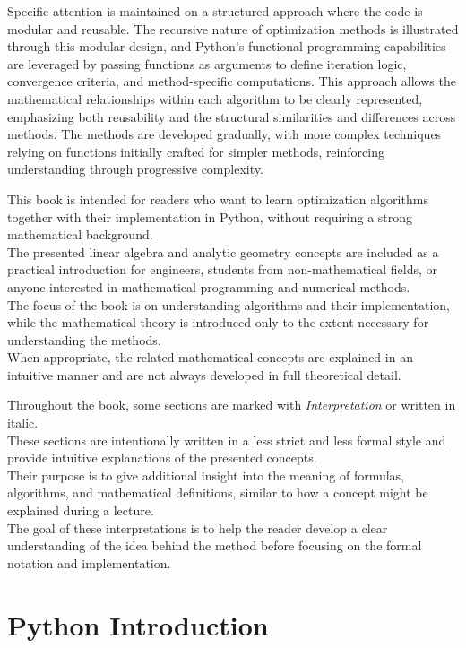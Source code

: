 \documentclass[11pt]{article}
\begin{document}
Specific attention is maintained on a structured approach where the code
is modular and reusable. The recursive nature of optimization methods is
illustrated through this modular design, and Python's functional
programming capabilities are leveraged by passing functions as arguments
to define iteration logic, convergence criteria, and method-specific
computations. This approach allows the mathematical relationships within
each algorithm to be clearly represented, emphasizing both reusability
and the structural similarities and differences across methods. The
methods are developed gradually, with more complex techniques relying on
functions initially crafted for simpler methods, reinforcing
understanding through progressive complexity.

This book is intended for readers who want to learn optimization
algorithms together with their implementation in Python, without
requiring a strong mathematical background.\\
The presented linear algebra and analytic geometry concepts are included
as a practical introduction for engineers, students from
non-mathematical fields, or anyone interested in mathematical
programming and numerical methods.\\
The focus of the book is on understanding algorithms and their
implementation, while the mathematical theory is introduced only to the
extent necessary for understanding the methods.\\
When appropriate, the related mathematical concepts are explained in an
intuitive manner and are not always developed in full theoretical
detail.

Throughout the book, some sections are marked with \emph{Interpretation}
or written in italic.\\
These sections are intentionally written in a less strict and less
formal style and provide intuitive explanations of the presented
concepts.\\
Their purpose is to give additional insight into the meaning of
formulas, algorithms, and mathematical definitions, similar to how a
concept might be explained during a lecture.\\
The goal of these interpretations is to help the reader develop a clear
understanding of the idea behind the method before focusing on the
formal notation and implementation.

    \newpage

\section{Python Introduction}\label{python-introduction}
\end{document}
